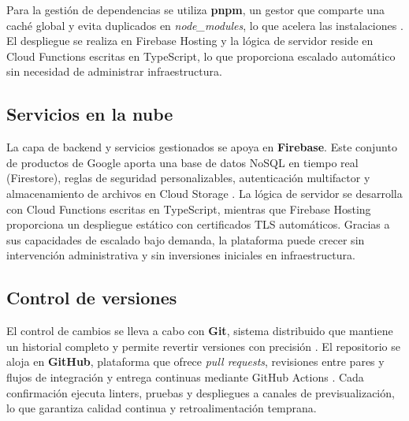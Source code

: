 \begin{large}
Para la gestión de dependencias se utiliza \textbf{pnpm}, un gestor que comparte una caché global y evita duplicados en \textit{node\_modules}, lo que acelera las instalaciones \cite{pnpm_docs2025}. El despliegue se realiza en Firebase Hosting y la lógica de servidor reside en Cloud Functions escritas en TypeScript, lo que proporciona escalado automático sin necesidad de administrar infraestructura.

\subsection*{Servicios en la nube}

La capa de backend y servicios gestionados se apoya en \textbf{Firebase}. Este conjunto de productos de Google aporta una base de datos NoSQL en tiempo real (Firestore), reglas de seguridad personalizables, autenticación multifactor y almacenamiento de archivos en Cloud Storage \cite{firebase_docs2025}. La lógica de servidor se desarrolla con Cloud Functions escritas en TypeScript, mientras que Firebase Hosting proporciona un despliegue estático con certificados TLS automáticos. Gracias a sus capacidades de escalado bajo demanda, la plataforma puede crecer sin intervención administrativa y sin inversiones iniciales en infraestructura.

\subsection*{Control de versiones}

El control de cambios se lleva a cabo con \textbf{Git}, sistema distribuido que mantiene un historial completo y permite revertir versiones con precisión \cite{git_book2023}. El repositorio se aloja en \textbf{GitHub}, plataforma que ofrece \textit{pull requests}, revisiones entre pares y flujos de integración y entrega continuas mediante GitHub Actions \cite{github_docs2025}. Cada confirmación ejecuta linters, pruebas y despliegues a canales de previsualización, lo que garantiza calidad continua y retroalimentación temprana.

\end{large}
